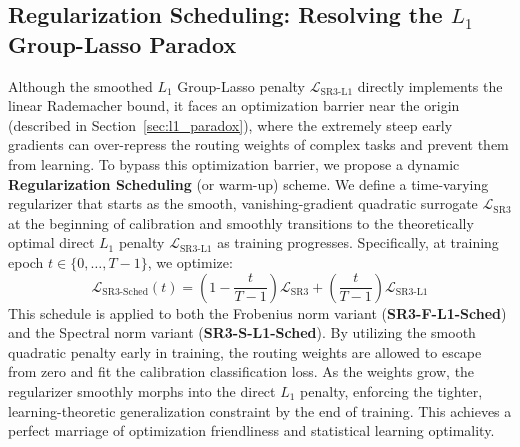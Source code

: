\subsection{Regularization Scheduling: Resolving the $L_1$ Group-Lasso Paradox}
Although the smoothed $L_1$ Group-Lasso penalty $\mathcal{L}_{\text{SR3-L1}}$ directly implements the linear Rademacher bound, it faces an optimization barrier near the origin (described in Section~\ref{sec:l1_paradox}), where the extremely steep early gradients can over-repress the routing weights of complex tasks and prevent them from learning. To bypass this optimization barrier, we propose a dynamic \textbf{Regularization Scheduling} (or warm-up) scheme. We define a time-varying regularizer that starts as the smooth, vanishing-gradient quadratic surrogate $\mathcal{L}_{\text{SR3}}$ at the beginning of calibration and smoothly transitions to the theoretically optimal direct $L_1$ penalty $\mathcal{L}_{\text{SR3-L1}}$ as training progresses. Specifically, at training epoch $t \in \{0, \dots, T-1\}$, we optimize:
\begin{equation}
    \mathcal{L}_{\text{SR3-Sched}}(t) = \left(1 - \frac{t}{T-1}\right) \mathcal{L}_{\text{SR3}} + \left(\frac{t}{T-1}\right) \mathcal{L}_{\text{SR3-L1}}
\end{equation}
This schedule is applied to both the Frobenius norm variant (\textbf{SR3-F-L1-Sched}) and the Spectral norm variant (\textbf{SR3-S-L1-Sched}). By utilizing the smooth quadratic penalty early in training, the routing weights are allowed to escape from zero and fit the calibration classification loss. As the weights grow, the regularizer smoothly morphs into the direct $L_1$ penalty, enforcing the tighter, learning-theoretic generalization constraint by the end of training. This achieves a perfect marriage of optimization friendliness and statistical learning optimality.

